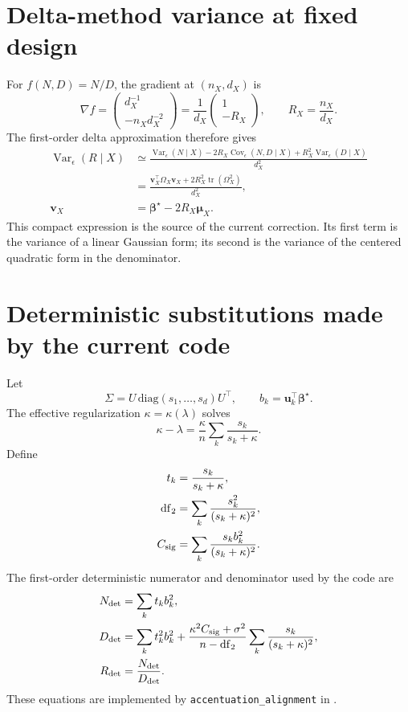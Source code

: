 \documentclass[11pt]{article}
\newcommand{\Var}{\operatorname{Var}}
\newcommand{\Cov}{\operatorname{Cov}}
\newcommand{\tr}{\operatorname{tr}}
\newcommand{\bstar}{\bm\beta^\star}
\begin{document}
\section{Delta-method variance at fixed design}

For \(f(N,D)=N/D\), the gradient at \((n_X,d_X)\) is
\begin{equation}
  \nabla f=
  \begin{pmatrix}
    d_X^{-1}\\
    -n_Xd_X^{-2}
  \end{pmatrix}
  =
  \frac{1}{d_X}
  \begin{pmatrix}
    1\\-R_X
  \end{pmatrix},
  \qquad R_X=\frac{n_X}{d_X}.
\end{equation}
The first-order delta approximation therefore gives
\begin{align}
  \Var_\epsilon(R\mid X)
  &\simeq
  \frac{
    \Var_\epsilon(N\mid X)
    -2R_X\Cov_\epsilon(N,D\mid X)
    +R_X^2\Var_\epsilon(D\mid X)
  }{d_X^2}\\
  &=
  \frac{
    \bm v_X^\top\Omega_X\bm v_X
    +2R_X^2\tr(\Omega_X^2)
  }{d_X^2},
  \label{eq:conditional-varR}\\
  \bm v_X&=\bstar-2R_X\bm\mu_X.
\end{align}
This compact expression is the source of the current correction.  Its first
term is the variance of a linear Gaussian form; its second is the variance of
the centered quadratic form in the denominator.

\section{Deterministic substitutions made by the current code}
\label{sec:current-code}

Let
\begin{equation}
  \Sigma=U\,\mathrm{diag}(s_1,\ldots,s_d)U^\top,\qquad
  b_k=\bm u_k^\top\bstar.
\end{equation}
The effective regularization \(\kappa=\kappa(\lambda)\) solves
\begin{equation}
  \kappa-\lambda
  =\frac{\kappa}{n}\sum_k\frac{s_k}{s_k+\kappa}.
  \label{eq:kappa}
\end{equation}
Define
\begin{align}
  t_k&=\frac{s_k}{s_k+\kappa},\\
  \mathrm{df}_2&=\sum_k\frac{s_k^2}{(s_k+\kappa)^2},\\
  C_{\rm sig}&=\sum_k\frac{s_kb_k^2}{(s_k+\kappa)^2}.
\end{align}
The first-order deterministic numerator and denominator used by the code are
\begin{align}
  N_{\rm det}
    &=\sum_k t_kb_k^2,
  \label{eq:Ndet}\\
  D_{\rm det}
    &=\sum_k t_k^2b_k^2
    +\frac{\kappa^2C_{\rm sig}+\sigma^2}
           {n-\mathrm{df}_2}
       \sum_k\frac{s_k}{(s_k+\kappa)^2},
  \label{eq:Ddet}\\
  R_{\rm det}&=\frac{N_{\rm det}}{D_{\rm det}}.
  \label{eq:Rdet}
\end{align}
These equations are implemented by
\texttt{accentuation\_alignment} in
.
\end{document}
